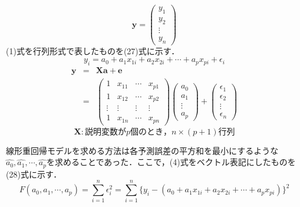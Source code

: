 \documentclass[dvipdfmx]{jsarticle}
\begin{document}
\begin{equation}
  \boldsymbol{y}=
  \left(
  \begin{array}{c}
      y_1    \\
      y_2    \\
      \vdots \\
      y_n
    \end{array}
  \right)
\end{equation}
(1)式を行列形式で表したものを(27)式に示す．
\begin{equation}
  y_i = a_0 + a_1x_{1i}+a_2x_{2i}+\cdots + a_p x_{pi}+\epsilon_i
  \tag{1}
\end{equation}
\begin{eqnarray}
  \boldsymbol{y}&=&\boldsymbol{X}\boldsymbol{a}+\boldsymbol{e}  \nonumber \\
  &=&
  \begin{pmatrix}
    1      & x_{11} & \cdots & x_{p1} \\
    1      & x_{12} & \cdots & x_{p2} \\
    \vdots & \vdots & \vdots & \vdots \\
    1      & x_{1n} & \cdots & x_{pn}
  \end{pmatrix}
  \left(
  \begin{array}{c}
      a_0    \\
      a_1    \\
      \vdots \\
      a_p
    \end{array}
  \right)
  +
  \left(
  \begin{array}{c}
      \epsilon_1 \\
      \epsilon_2 \\
      \vdots     \\
      \epsilon_n
    \end{array}
  \right)
\end{eqnarray}
\begin{equation}
  \boldsymbol{X}:説明変数がp個のとき，n×(p+1)行列 \nonumber
\end{equation}

線形重回帰モデルを求める方法は各予測誤差の平方和を最小にするような$\hat{a_0},\hat{a_1},\cdots,\hat{a_p}$を求めることであった．ここで，(4)式をベクトル表記にしたものを(28)式に示す．
\begin{equation}
  F(a_0,a_1,\cdots,a_p)=\sum_{i=1}^{n}\epsilon_i^2=\sum_{i=1}^{n}\{ y_i - (a_0 + a_1x_{1i}+a_2x_{2i}+\cdots + a_p x_{pi})\}^2
  \tag{4}
\end{equation}
\end{document}
